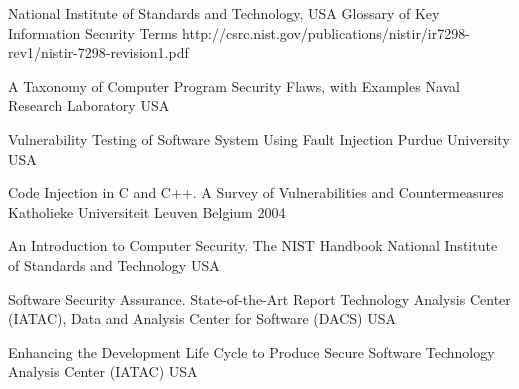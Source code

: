 \begin{thebibliography}{9}
		{National Institute of Standards and Technology, USA}
		{Glossary of Key Information Security Terms}
		{}
		{http://csrc.nist.gov/publications/nistir/ir7298-rev1/nistir-7298-revision1.pdf}
		

		{
			\BibAnd
			\BibAnd
			\BibAnd
			}
		{A Taxonomy of Computer Program Security Flaws, with Examples}
		{Naval Research Laboratory}
		{USA}
		{}
		
		{
			\BibAnd
			}
		{Vulnerability Testing of Software System Using Fault Injection}
		{Purdue University}
		{USA}
		{}

		{
			\BibAnd
			\BibAnd
			}
		{Code Injection in {C} and {C++}. A Survey of Vulnerabilities and Countermeasures}
		{Katholieke Universiteit Leuven}
		{Belgium}
		{2004}
		
		{}
		{An Introduction to Computer Security. The {NIST} Handbook}
		{National Institute of Standards and Technology}
		{USA}
		{}

		{
			\BibAnd
			}
		{Software Security Assurance. State-of-the-Art Report}
		{Technology Analysis Center (IATAC), Data and Analysis Center for Software (DACS)}
		{USA}
		{}
	
		{
			\BibAnd
			}
		{Enhancing the Development Life Cycle to Produce Secure Software}
		{Technology Analysis Center (IATAC)}
		{USA}
		{}



\end{thebibliography}
